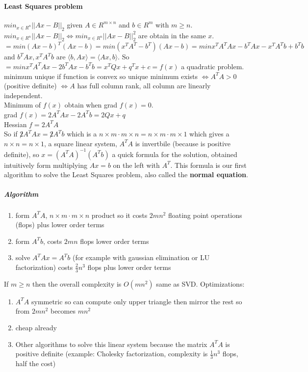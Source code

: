 \documentclass[10pt]{report}
\begin{document}
\paragraph{Least Squares problem} $min_{x\in R^n} ||Ax - B||_2$ given $A \in R^{m\times n}$ and $b \in R^m$ with $m\geq n$.\\
$min_{x\in R^n} ||Ax - B||_2 \Leftrightarrow min_{x\in R^n} ||Ax - B||^2_2$ are obtain in the same $x$.\\
$= min(Ax-b)^T(Ax-b) = min(x^TA^T-b^T)(Ax-b) = min x^TA^TAx - b^TAx - x^TA^Tb + b^Tb$ and $b^TAx, x^TA^Tb$ are $\langle b, Ax\rangle = \langle Ax,b\rangle$. So\\
$= min x^TA^TAx - 2b^TAx - b^Tb = x^TQx + q^Tx + c = f(x)$ a quadratic problem. minimum unique if function is convex so unique minimum exists $\Leftrightarrow A^TA > 0$ (positive definite) $\Leftrightarrow A$ has full column rank, all column are linearly independent.\\
Minimum of $f(x)$ obtain when grad $f(x) = 0$.\\
grad $f(x) = 2A^TAx - 2A^Tb = 2Qx + q$\\
Hessian $f = 2A^TA$\\
So if $\not 2 A^TAx = \not 2 A^Tb$ which is a $n\times m\cdot m \times n = n\times m \cdot m \times 1$ which gives a $n\times n = n \times 1$, a square linear system, $A^TA$ is invertbile (because is positive definite), so $x = (A^TA)^{-1} (A^Tb)$ a quick formula for the solution, obtained intuitively form multiplying $Ax = b$ on the left with $A^T$. This formula is our first algorithm to solve the Least Squares problem, also called the \textbf{normal equation}.
\subparagraph{Algorithm}
\begin{enumerate}
	\item form $A^TA$, $n\times m\cdot m\times n$ product so it costs $2mn^2$ floating point operations (flops) plus lower order terms
	\item form $A^Tb$, costs $2mn$ flops lower order terms
	\item solve $A^TAx = A^Tb$ (for example with gaussian elimination or LU factorization) costs $\frac{2}{3}n^3$ flops plus lower order terms
\end{enumerate}
If $m \geq n$ then the overall complexity is $O(mn^2)$ same as SVD. Optimizations:
\begin{enumerate}
	\item $A^TA$ symmetric so can compute only upper triangle then mirror the rest so from $2mn^2$ becomes $mn^2$
	\item cheap already
	\item Other algorithms to solve this linear system because the matrix $A^TA$ is positive definite (example: Cholesky factorization, complexity is $\frac{1}{3}n^3$ flops, half the cost)
\end{enumerate}
\end{document}
